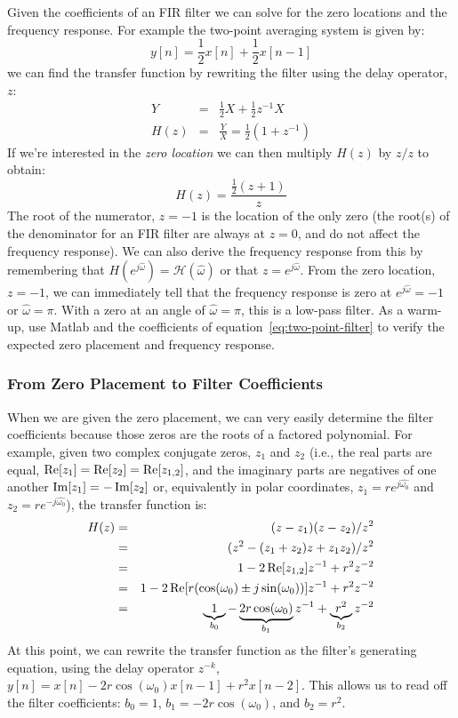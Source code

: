 Given the coefficients of an FIR filter we can solve for the zero
locations and the frequency response.  For example the two-point
averaging system is given by:
\begin{equation}
y[n] = \frac{1}{2}x[n] + \frac{1}{2}x[n-1]
\label{eq:two-point-filter}
\end{equation}
we can find the transfer function by rewriting the filter using the
delay operator, $z$:
\begin{eqnarray}
  Y    & = & \frac{1}{2} X + \frac{1}{2} z^{-1} X \\
  H(z) & = & \frac{Y}{X} = \frac{1}{2} (1 +  z^{-1})
\end{eqnarray}
If we're interested in the \emph{zero location} we can then multiply
$H(z)$ by $z/z$ to obtain:
\begin{equation}
  H(z) = \frac{\frac{1}{2} (z + 1)}{z}
\end{equation}
The root of the numerator, $z=-1$ is the location of the only zero
(the root(s) of the denominator for an FIR filter are always at $z=0$,
and do not affect the frequency response). We can also derive the
frequency response from this by remembering that $H(e^{j\hat{\omega}})
= \mathcal{H}({\hat{\omega}})$ or that $z=e^{j\hat{\omega}}$. From the
zero location, $z=-1$, we can immediately tell that the frequency
response is zero at $e^{j\hat{\omega}}=-1$ or $\hat{\omega}=\pi$. With
a zero at an angle of $\hat{\omega}=\pi$, this is a low-pass
filter. As a warm-up, use Matlab and the coefficients of
equation~\ref{eq:two-point-filter} to verify the expected zero
placement and frequency response.

\subsubsection{From Zero Placement to Filter Coefficients}

When we are given the zero placement, we can very easily determine the
filter coefficients because those zeros are the roots of a factored
polynomial. For example, given two complex conjugate zeros, $z_1$ and
$z_2$ (i.e., the real parts are equal, $\operatorname{Re}[z_{1}] = \operatorname{Re}[z_{2}] =
\operatorname{Re}[z_{1,2}] $, and the imaginary parts are negatives of one another
$ \operatorname{Im}[z_{1}] = -\operatorname{Im}[z_{2}] $ or, equivalently in polar
coordinates, $z_{1} = r e^{j\hat{\omega_0}}$ and $z_{2} = r
e^{-j\hat{\omega_0}}$), the transfer function is:
\begin{eqnarray}
  H(z) & = & (z - z_1)(z - z_2)/z^2 \\
  & = & (z^2 - (z_1 + z_2) z + z_1 z_2)/z^2 \\
  & = & 1 - 2 \operatorname{Re}[{z_{1,2}}] z^{-1} + r^2 z^{-2} \\
  & = & 1 - 2 \operatorname{Re}[r(\cos(\omega_0) \pm j\sin(\omega_0))] z^{-1} + r^2 z^{-2} \\
  & = & \underbrace{1}_{b_0} -\underbrace{2 r\cos(\omega_0)}_{b_1} z^{-1} + \underbrace{r^2}_{b_2} z^{-2}
\end{eqnarray}
At this point, we can rewrite the transfer function as the filter's
generating equation, using the delay operator $z^{-k}$, $y[n] = x[n] -
2 r\cos(\omega_0)x[n-1] + r^2 x[n-2]$. This allows us to read off the
filter coefficients: $b_0 = 1$, $b_1 = -2 r\cos(\omega_0)$, and $b_2 =
r^2$.


